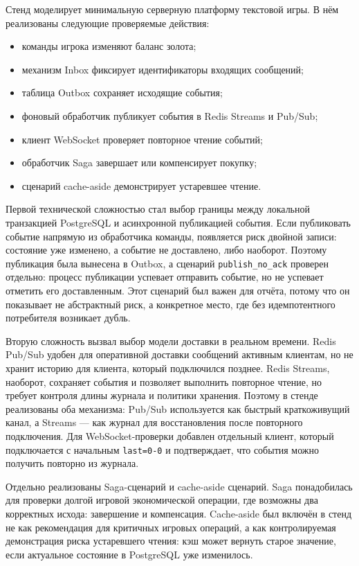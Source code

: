 \documentclass[a4paper,14pt]{extarticle}
\numberwithin{figure}{section}
\numberwithin{table}{section}
\begin{document}
Стенд моделирует минимальную серверную платформу текстовой игры. В нём реализованы следующие проверяемые действия:
\begin{itemize}
\item команды игрока изменяют баланс золота;
\item механизм Inbox фиксирует идентификаторы входящих сообщений;
\item таблица Outbox сохраняет исходящие события;
\item фоновый обработчик публикует события в Redis Streams и Pub/Sub;
\item клиент WebSocket проверяет повторное чтение событий;
\item обработчик Saga завершает или компенсирует покупку;
\item сценарий cache-aside демонстрирует устаревшее чтение.
\end{itemize}

Первой технической сложностью стал выбор границы между локальной транзакцией PostgreSQL и асинхронной публикацией события. Если публиковать событие напрямую из обработчика команды, появляется риск двойной записи: состояние уже изменено, а событие не доставлено, либо наоборот. Поэтому публикация была вынесена в Outbox, а сценарий \texttt{publish\_no\_ack} проверен отдельно: процесс публикации успевает отправить событие, но не успевает отметить его доставленным. Этот сценарий был важен для отчёта, потому что он показывает не абстрактный риск, а конкретное место, где без идемпотентного потребителя возникает дубль.

Вторую сложность вызвал выбор модели доставки в реальном времени. Redis Pub/Sub удобен для оперативной доставки сообщений активным клиентам, но не хранит историю для клиента, который подключился позднее. Redis Streams, наоборот, сохраняет события и позволяет выполнить повторное чтение, но требует контроля длины журнала и политики хранения. Поэтому в стенде реализованы оба механизма: Pub/Sub используется как быстрый краткоживущий канал, а Streams --- как журнал для восстановления после повторного подключения. Для WebSocket-проверки добавлен отдельный клиент, который подключается с начальным \texttt{last=0-0} и подтверждает, что события можно получить повторно из журнала.

Отдельно реализованы Saga-сценарий и cache-aside сценарий. Saga понадобилась для проверки долгой игровой экономической операции, где возможны два корректных исхода: завершение и компенсация. Cache-aside был включён в стенд не как рекомендация для критичных игровых операций, а как контролируемая демонстрация риска устаревшего чтения: кэш может вернуть старое значение, если актуальное состояние в PostgreSQL уже изменилось.
\end{document}
